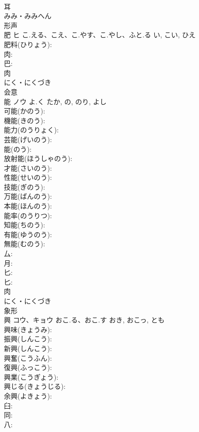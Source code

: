 \documentclass[8pt]{extreport}
\begin{document}
\begin{CJK}{UTF8}{min}
\\	耳	
\\	みみ・みみへん	
\\	形声 
\\	肥	ヒ	こ.える、こえ、こ.やす、こ.やし、ふと.る	い, こい, ひえ	
\\	肥料(ひりょう): 
\\	肉: 
\\	巴: 
\\	肉	
\\	にく・にくづき	
\\	会意 
\\	能	ノウ	よ.く	たか, の, のり, よし	
\\	可能(かのう): 
\\	機能(きのう): 
\\	能力(のうりょく): 
\\	芸能(げいのう): 
\\	能(のう): 
\\	放射能(ほうしゃのう): 
\\	才能(さいのう): 
\\	性能(せいのう): 
\\	技能(ぎのう): 
\\	万能(ばんのう): 
\\	本能(ほんのう): 
\\	能率(のうりつ): 
\\	知能(ちのう): 
\\	有能(ゆうのう): 
\\	無能(むのう): 
\\	厶: 
\\	月: 
\\	匕: 
\\	匕: 
\\	肉	
\\	にく・にくづき	
\\	象形 
\\	興	コウ、キョウ	おこ.る、おこ.す	おき, おこっ, とも	
\\	興味(きょうみ): 
\\	振興(しんこう): 
\\	新興(しんこう): 
\\	興奮(こうふん): 
\\	復興(ふっこう): 
\\	興業(こうぎょう): 
\\	興じる(きょうじる): 
\\	余興(よきょう): 
\\	臼: 
\\	同: 
\\	八: 

\end{CJK}
\end{document}
